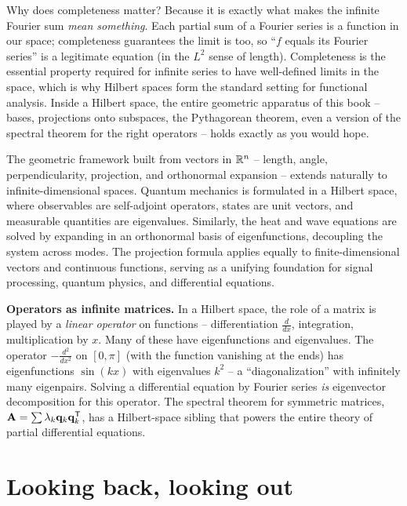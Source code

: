 Why does completeness matter? Because it is exactly what makes the infinite Fourier
sum \emph{mean something}. Each partial sum of a Fourier series is a function in our
space; completeness guarantees the limit is too, so ``$f$ equals its Fourier series''
is a legitimate equation (in the $L^2$ sense of length). Completeness is the essential
property required for infinite series to have well-defined limits in the space, which is
why Hilbert spaces form the standard setting for functional analysis.
Inside a Hilbert space, the entire geometric apparatus of this book -- bases,
projections onto subspaces, the Pythagorean theorem, even a version of the spectral
theorem for the right operators -- holds exactly as you would hope.

\begin{aestheticbox}
The geometric framework built from vectors in $\mathbb{R}^n$ -- length, angle,
perpendicularity, projection, and orthonormal expansion -- extends naturally to
infinite-dimensional spaces. Quantum mechanics is formulated in a Hilbert space,
where observables are self-adjoint operators, states are unit vectors, and
measurable quantities are eigenvalues. Similarly, the heat and wave equations are
solved by expanding in an orthonormal basis of eigenfunctions, decoupling the
system across modes. The projection formula applies equally to finite-dimensional
vectors and continuous functions, serving as a unifying foundation for signal
processing, quantum physics, and differential equations.
\end{aestheticbox}

\begin{connectionbox}
\textbf{Operators as infinite matrices.} In a Hilbert space, the role of a matrix is
played by a \emph{linear operator} on functions -- differentiation $\frac{d}{dx}$,
integration, multiplication by $x$. Many of these have eigenfunctions and
eigenvalues. The operator $-\frac{d^2}{dx^2}$ on $[0,\pi]$ (with the function
vanishing at the ends) has eigenfunctions $\sin(kx)$ with eigenvalues $k^2$ -- a
``diagonalization'' with infinitely many eigenpairs. Solving a differential equation
by Fourier series \emph{is} eigenvector decomposition for this operator. The
spectral theorem for symmetric matrices, $\mathbf{A}=\sum\lambda_k\mathbf{q}_k\mathbf{q}_k^{\mathsf{T}}$,
has a Hilbert-space sibling that powers the entire theory of partial differential
equations.
\end{connectionbox}

\section{Looking back, looking out}
\label{ch37:lookback}

